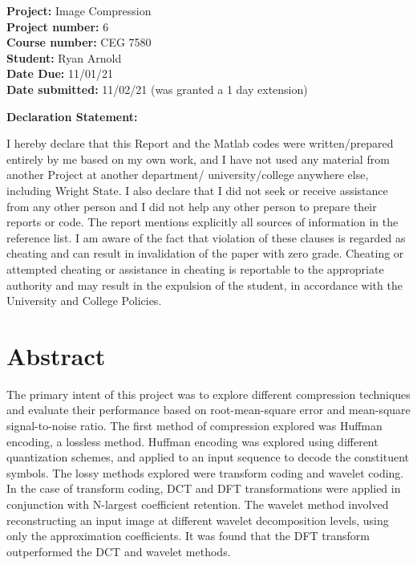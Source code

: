 \documentclass[./rarnold_project_89.tex]{subfiles}
\begin{document}


\begin{titlepage}

\noindent
\textbf{Project:} Image Compression \\
\textbf{Project number:} 6\\
\textbf{Course number:} CEG 7580\\
\textbf{Student:} Ryan Arnold \\
\textbf{Date Due:} 11/01/21 \\
\textbf{Date submitted:} 11/02/21 (was granted a 1 day extension)
\vspace{24pt}

\noindent \textbf{Declaration Statement: }

\noindent I hereby declare that this Report and the Matlab codes were written/prepared entirely by me based on my own work, and I have not used any material from another Project at another department/ university/college anywhere else, including Wright State. I also declare that I did not seek or receive assistance from any other person and I did not help any other person to prepare their reports or code.  The report mentions explicitly all sources of information in the reference list. I am aware of the fact that violation of these clauses is regarded as cheating and can result in invalidation of the paper with zero grade. Cheating or attempted cheating or assistance in cheating is reportable to the appropriate authority and may result in the expulsion of the student, in accordance with the University and College Policies.

\end{titlepage}

\clearpage
\section*{Abstract}

\noindent The primary intent of this project was to explore different compression techniques and evaluate their performance based on root-mean-square error and mean-square signal-to-noise ratio.  The first method of compression explored was Huffman encoding, a lossless method.  Huffman encoding was explored using different quantization schemes, and applied to an input sequence to decode the constituent symbols.  The lossy methods explored were transform coding and wavelet coding.  In the case of transform coding, DCT and DFT transformations were applied in conjunction with N-largest coefficient retention.    The wavelet method involved reconstructing an input image at different wavelet decomposition levels, using only the approximation coefficients.  It was found that the DFT transform outperformed the DCT and wavelet methods.
\end{document}
